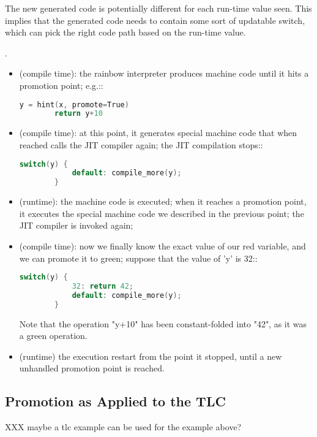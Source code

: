 The new generated code is potentially different for each run-time value
seen.  This implies that the generated code needs to contain some sort
of updatable switch, which can pick the right code path based on the
run-time value.

.

\begin{itemize}
  XXX remove mention of rainbow interp. but this needs to be rewritten anyway
  \item (compile time): the rainbow interpreter produces machine code until it
    hits a promotion point; e.g.::

    \begin{lstlisting}[language=C]
        y = hint(x, promote=True)
        return y+10
    \end{lstlisting}

  \item (compile time): at this point, it generates special machine code that when
    reached calls the JIT compiler again; the JIT compilation stops::

    \begin{lstlisting}[language=C]
        switch(y) {
            default: compile_more(y);
        }
    \end{lstlisting}

  \item (runtime): the machine code is executed; when it reaches a promotion
    point, it executes the special machine code we described in the previous
    point; the JIT compiler is invoked again;

  \item (compile time): now we finally know the exact value of our red variable,
    and we can promote it to green; suppose that the value of 'y' is 32::

    \begin{lstlisting}[language=C]
        switch(y) {
            32: return 42;
            default: compile_more(y);
        }
    \end{lstlisting}

    Note that the operation "y+10" has been constant-folded into "42", as it
    was a green operation.

  \item (runtime) the execution restart from the point it stopped, until a new
    unhandled promotion point is reached.
\end{itemize}

\subsection{Promotion as Applied to the TLC}

XXX maybe a tlc example can be used for the example above?


